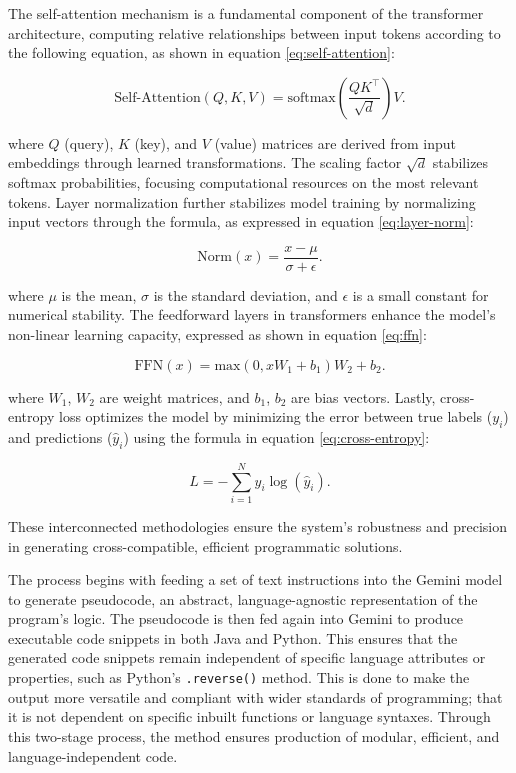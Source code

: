 \documentclass{dhbenelux}
\begin{document}
The self-attention mechanism is a fundamental component of the transformer architecture, computing relative relationships between input tokens according to the following equation, as shown in equation \ref{eq:self-attention}:

\begin{equation}
\text{Self-Attention}(Q, K, V) = \text{softmax}\left(\frac{QK^\top}{\sqrt{d}}\right)V.
\label{eq:self-attention}
\end{equation}

where \( Q \) (query), \( K \) (key), and \( V \) (value) matrices are derived from input embeddings through learned transformations. The scaling factor \( \sqrt{d} \) stabilizes softmax probabilities, focusing computational resources on the most relevant tokens. Layer normalization further stabilizes model training by normalizing input vectors through the formula, as expressed in equation \ref{eq:layer-norm}:

\begin{equation}
\text{Norm}(x) = \frac{x - \mu}{\sigma + \epsilon}.
\label{eq:layer-norm}
\end{equation}

where \( \mu \) is the mean, \( \sigma \) is the standard deviation, and \( \epsilon \) is a small constant for numerical stability. The feedforward layers in transformers enhance the model’s non-linear learning capacity, expressed as shown in equation \ref{eq:ffn}:

\begin{equation}
\text{FFN}(x) = \text{max}(0, xW_1 + b_1)W_2 + b_2.
\label{eq:ffn}
\end{equation}

where \( W_1 \), \( W_2 \) are weight matrices, and \( b_1 \), \( b_2 \) are bias vectors. Lastly, cross-entropy loss optimizes the model by minimizing the error between true labels (\( y_i \)) and predictions (\( \hat{y}_i \)) using the formula in equation \ref{eq:cross-entropy}:

\begin{equation}
L = -\sum_{i=1}^N y_i \log(\hat{y}_i).
\label{eq:cross-entropy}
\end{equation}

These interconnected methodologies ensure the system’s robustness and precision in generating cross-compatible, efficient programmatic solutions.


The process begins with feeding a set of text instructions into the Gemini model to generate pseudocode, an abstract, language-agnostic representation of the program's logic. The pseudocode is then fed again into Gemini to produce executable code snippets in both Java and Python. This ensures that the generated code snippets remain independent of specific language attributes or properties, such as Python's \texttt{.reverse()} method. This is done to make the output more versatile and compliant with wider standards of programming; that it is not dependent on specific inbuilt functions or language syntaxes. Through this two-stage process, the method ensures production of modular, efficient, and language-independent code.
\end{document}
